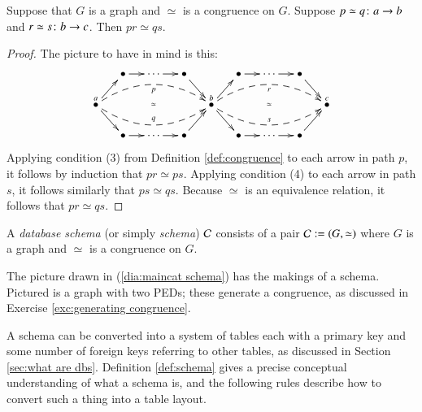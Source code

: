 \begin{lemma}\label{lemma:composing PEDs}

Suppose that $G$ is a graph and $\simeq$ is a congruence on $G$. Suppose $p\simeq q\colon a\rightarrow b$ and $r\simeq s\colon b\rightarrow c$. Then $pr\simeq qs$.

\end{lemma}

\begin{proof}

The picture to have in mind is this: $$\xymatrix@=13pt{&\bullet\ar[r]&\cdots\ar[r]&\bullet\ar[dr]&&\bullet\ar[r]&\cdots\ar[r]&\bullet\ar[dr]\\\LMO{a}\ar@{}[rrrr]|{\simeq}\ar[ur]\ar[dr]\ar@{-->}@/^1.5pc/[rrrr]_p\ar@{-->}@/_1.5pc/[rrrr]^q&&&&\LMO{b}\ar@{}[rrrr]|{\simeq}\ar[ur]\ar[dr]\ar@{-->}@/^1.5pc/[rrrr]_r\ar@{-->}@/_1.5pc/[rrrr]^s&&&&\LMO{c}\\&\bullet\ar[r]&\cdots\ar[r]&\bullet\ar[ur]&&\bullet\ar[r]&\cdots\ar[r]&\bullet\ar[ur]}$$ Applying condition (3) from Definition \ref{def:congruence} to each arrow in path $p$, it follows by induction that $pr\simeq ps$. Applying condition (4) to each arrow in path $s$, it follows similarly that $ps\simeq qs$. Because $\simeq$ is an equivalence relation, it follows that $pr\simeq qs$. 

\end{proof}

\begin{definition}\label{def:schema}

A {\em database schema} (or simply {\em schema}) $\mathcal{C}$ consists of a pair $\mathcal{C}:=(G,\simeq)$ where $G$ is a graph and $\simeq$ is a congruence on $G$. 

\end{definition}

\begin{example}

The picture drawn in (\ref{dia:maincat schema}) has the makings of a schema. Pictured is a graph with two PEDs; these generate a congruence, as discussed in Exercise \ref{exc:generating congruence}.  

\end{example}

A schema can be converted into a system of tables each with a primary key and some number of foreign keys referring to other tables, as discussed in Section \ref{sec:what are dbs}. Definition \ref{def:schema} gives a precise conceptual understanding of what a schema is, and the following rules describe how to convert such a thing into a table layout.

